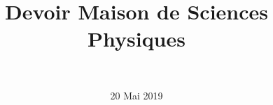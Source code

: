 \documentclass[a4paper,11pt]{exam}
\author{\ }
\date{20 Mai 2019}
\title{Devoir Maison de Sciences Physiques}
\begin{document}
%	

	\maketitle
%	
	
	



%
%
%

%






%







\newpage








%

%




 
%
\ \label{LastPage}
\end{document}
